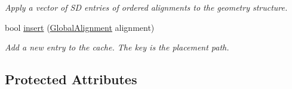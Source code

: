 \begin{DoxyCompactItemize}
$$\begin{DoxyCompactList}\small\item\em Apply a vector of SD entries of ordered alignments to the geometry structure. \end{DoxyCompactList}\item 
bool \hyperlink{class_d_d4hep_1_1_alignments_1_1_global_alignment_cache_a023ee1b04bc17e8be3a8225f79316daf}{insert} (\hyperlink{class_d_d4hep_1_1_alignments_1_1_global_alignment}{Global\+Alignment} alignment)
\begin{DoxyCompactList}\small\item\em Add a new entry to the cache. The key is the placement path. \end{DoxyCompactList}\end{DoxyCompactItemize}
\subsection*{Protected Attributes}
